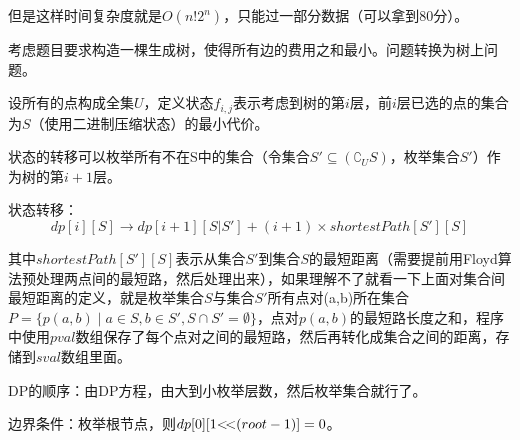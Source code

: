 \documentclass{article}
\theoremstyle{nonumberplain}
\begin{document}
	但是这样时间复杂度就是$O(n!2^n)$，只能过一部分数据（可以拿到80分）。

	考虑题目要求构造一棵生成树，使得所有边的费用之和最小。问题转换为树上问题。

	设所有的点构成全集$U$，定义状态$f_{i,j}$表示考虑到树的第$i$层，前$i$层已选的点的集合为$S$（使用二进制压缩状态）的最小代价。

	状态的转移可以枚举所有不在S中的集合（令集合$S'\subseteq(\complement_U S)$，枚举集合$S'$）作为树的第$i+1$层。

	状态转移：
	\begin{equation*}
		dp[i][S]\to dp[i+1][S|S']+(i+1)\times shortestPath[S'][S]
	\end{equation*}

	其中$shortestPath[S'][S]$表示从集合$S'$到集合$S$的最短距离（需要提前用Floyd算法预处理两点间的最短路，然后处理出来），如果理解不了就看一下上面对集合间最短距离的定义，就是枚举集合$S$与集合$S'$所有点对(a,b)所在集合$P=\{p(a,b)\mid a\in S, b\in S', S\cap S'=\emptyset\}$，点对$p(a,b)$的最短路长度之和，程序中使用$pval$数组保存了每个点对之间的最短路，然后再转化成集合之间的距离，存储到$sval$数组里面。

	DP的顺序：由DP方程，由大到小枚举层数，然后枚举集合就行了。

	边界条件：枚举根节点，则$dp[0][1\text{<\!<}(root-1)]=0$。
\end{document}
